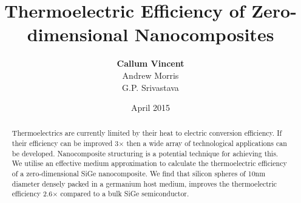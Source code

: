 \title{\textbf{Thermoelectric Efficiency of Zero-dimensional Nanocomposites}}
\author{\textbf{Callum Vincent}\\%
Andrew Morris\\
G.P. Srivastava}
\date{April 2015}
\maketitle

\begin{abstract}
\noindent
Thermoelectrics are currently limited by their heat to electric conversion efficiency. If their efficiency can be improved 3$\times$ then a wide array of technological applications can be developed. Nanocomposite structuring is a potential technique for achieving this. We utilise an effective medium approximation to calculate the thermoelectric efficiency of a zero-dimensional SiGe nanocomposite. We find that silicon spheres of 10nm diameter densely packed in a germanium host medium, improves the thermoelectric efficiency 2.6$\times$ compared to a bulk SiGe semiconductor.
\vfill
\end{abstract}

\pagedecorationleft
\pagedecorationright

\thispagestyle{empty}